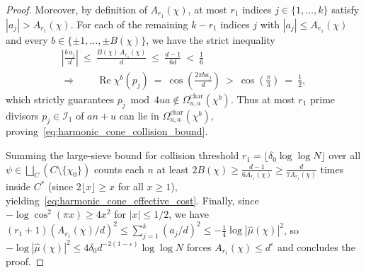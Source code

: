 \documentclass[11pt, a4paper]{article}
\theoremstyle{plain}
\theoremstyle{definition}
\begin{document}
\begin{proof}
Moreover, by definition of $A_{r_1}(\chi)$, at most $r_1$ indices $j\in\{1,\dots,k\}$ satisfy $|a_j|>A_{r_1}(\chi)$. For each of the remaining $k-r_1$ indices $j$ with $|a_j|\le A_{r_1}(\chi)$ and every $b\in\{\pm1,\dots,\pm B(\chi)\}$, we have the strict inequality
\[
\begin{gathered}
\left|\frac{b\,a_j}{d}\right|\ \le\ \frac{B(\chi)\,A_{r_1}(\chi)}{d}\ \le\ \frac{d-1}{6d}\ <\ \frac16 \\
\Longrightarrow\qquad\operatorname{Re}\chi^{b}(p_j)\ =\ \cos\!\left(\frac{2\pi b a_j}{d}\right)\ >\ \cos\!\left(\frac{\pi}{3}\right)\ =\ \frac12,
\end{gathered}
\]
which strictly guarantees $p_j\bmod 4ua\notin\Omega_{u,a}^{\mathrm{char}}(\chi^{b})$. Thus at most $r_1$ prime divisors $p_j\in\mathcal{I}_1$ of $an+u$ can lie in $\Omega_{u,a}^{\mathrm{char}}(\chi^{b})$, proving~\eqref{eq:harmonic_cone_collision_bound}. 

Summing the large-sieve bound for collision threshold $r_1=\lfloor\delta_0\log\log N\rfloor$ over all $\psi\in\bigsqcup_{C}(C\setminus\{\chi_0\})$ counts each $n$ at least $2B(\chi)\ge\frac{d-1}{6A_{r_1}(\chi)}\ge\frac{d}{7A_{r_1}(\chi)}$ times inside $C^{\ast}$ (since $2\lfloor x\rfloor\ge x$ for all $x\ge 1$), yielding~\eqref{eq:harmonic_cone_effective_cost}. Finally, since $-\log\cos^{2}(\pi x)\ge 4x^{2}$ for $|x|\le1/2$, we have $(r_1+1)(A_{r_1}(\chi)/d)^{2}\le\sum_{j=1}^{k}(a_j/d)^{2}\le-\frac14\log|\widehat{\mu}(\chi)|^{2}$, so $-\log|\widehat{\mu}(\chi)|^{2}\le 4\delta_0 d^{-2(1-\varepsilon)}\log\log N$ forces $A_{r_1}(\chi)\le d^{\varepsilon}$ and concludes the proof.
\end{proof}
\end{document}

